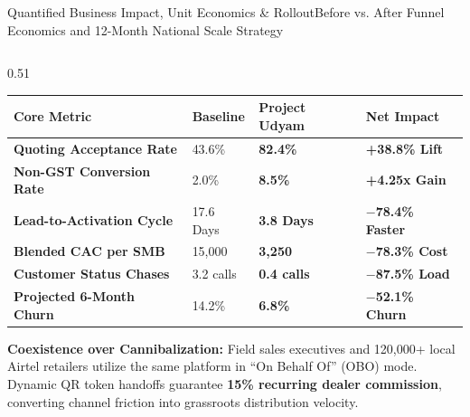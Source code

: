 \documentclass[aspectratio=169,10pt]{beamer}
\newcommand{\inr}{\text{Rs.\ }}
\begin{document}
\begin{frame}{Quantified Business Impact, Unit Economics \& Rollout}{Before vs. After Funnel Economics and 12-Month National Scale Strategy}
  \begin{columns}[T]
    \begin{column}{0.51\textwidth}
      \begin{tcolorbox}[academicbox, title={\fontsize{6.5pt}{7.8pt}\selectfont\textbf{Funnel Unit Economic Transformation}}, coltitle=charcoal]
        {\fontsize{5.0pt}{6.2pt}\selectfont
        \setlength{\tabcolsep}{2pt}
        \begin{tabularx}{\linewidth}{p{2.3cm}X<{\raggedleft}X<{\raggedleft}X<{\raggedleft}}
          \toprule
          \textbf{Core Metric} & \textbf{Baseline} & \textbf{Project Udyam} & \textbf{Net Impact} \\
          \midrule
          \textbf{Quoting Acceptance Rate} & 43.6\% & \textbf{82.4\%} & \textcolor{successgreen}{\textbf{+38.8\% Lift}} \\
          \textbf{Non-GST Conversion Rate} & 2.0\% & \textbf{8.5\%} & \textcolor{successgreen}{\textbf{+4.25x Gain}} \\
          \textbf{Lead-to-Activation Cycle} & 17.6 Days & \textbf{3.8 Days} & \textcolor{successgreen}{\textbf{$-$78.4\% Faster}} \\
          \textbf{Blended CAC per SMB} & \inr 15,000 & \textbf{\inr 3,250} & \textcolor{successgreen}{\textbf{$-$78.3\% Cost}} \\
          \textbf{Customer Status Chases} & 3.2 calls & \textbf{0.4 calls} & \textcolor{successgreen}{\textbf{$-$87.5\% Load}} \\
          \textbf{Projected 6-Month Churn} & 14.2\% & \textbf{6.8\%} & \textcolor{successgreen}{\textbf{$-$52.1\% Churn}} \\
          \bottomrule
        \end{tabularx}
        }
      \end{tcolorbox}

      \vspace{0.06cm}
      \begin{tcolorbox}[accentbox, title={\fontsize{6.5pt}{7.8pt}\selectfont\textbf{Phygital Partner Assisted Ingress (OBO Mode)}}, coltitle=charcoal]
        {\fontsize{5.2pt}{6.4pt}\selectfont
        \textbf{Coexistence over Cannibalization:} Field sales executives and 120,000+ local Airtel retailers utilize the same platform in ``On Behalf Of'' (OBO) mode. Dynamic QR token handoffs guarantee \textbf{15\% recurring dealer commission}, converting channel friction into grassroots distribution velocity.
        }
      \end{tcolorbox}
    \end{column}


\end{columns}
\end{frame}
\end{document}
